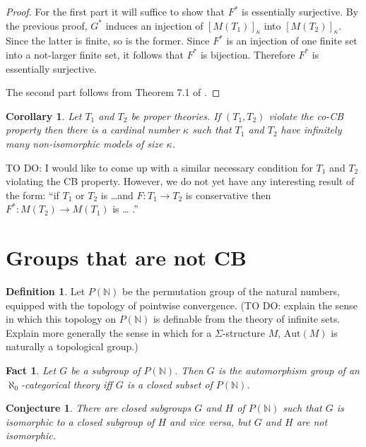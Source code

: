 \documentclass[12pt]{article}
\newtheorem{fact}[prop]{Fact}
\newtheorem{cor}[prop]{Corollary}
\newtheorem{conj}[prop]{Conjecture}
\theoremstyle{definition}
\newtheorem*{defn}{Definition}
\theoremstyle{remark}
\newcommand{\3}{\mathcal}
\begin{document}
\begin{proof} For the first part it will suffice to show that $F^*$ is
  essentially surjective. By the previous proof, $G^*$ induces an
  injection of $[M(T_1)]_\kappa$ into $[M(T_2)]_\kappa$. Since the
  latter is finite, so is the former. Since $F^*$ is an injection of
  one finite set into a not-larger finite set, it follows that $F^*$
  is bijection. Therefore $F^*$ is essentially surjective.

  The second part follows from Theorem 7.1 of
  \citep{summer2020}. \end{proof}

\begin{cor} Let $T_1$ and $T_2$ be proper theories. If $(T_1,T_2)$
  violate the co-CB property then there is a cardinal number $\kappa$
  such that $T_1$ and $T_2$ have infinitely many non-isomorphic models
  of size $\kappa$. \end{cor}

TO DO: I would like to come up with a similar necessary condition for
$T_1$ and $T_2$ violating the CB property. However, we do not yet have
any interesting result of the form: ``if $T_1$ or $T_2$ is \dots and
$F:T_1\to T_2$ is conservative then $F^*:M(T_2)\to M(T_1)$ is \dots
.''



\section{Groups that are not CB}

\begin{defn} Let $P(\mathbb{N})$ be the permutation group of the
  natural numbers, equipped with the topology of pointwise
  convergence. (TO DO: explain the sense in which this topology on
  $P(\mathbb{N})$ is definable from the theory of infinite
  sets. Explain more generally the sense in which for a
  $\Sigma$-structure $M$, $\mathrm{Aut}(M)$ is naturally a topological
  group.) \end{defn}

\begin{fact} Let $G$ be a subgroup of $P(\mathbb{N})$. Then $G$ is the
  automorphism group of an $\aleph _0$-categorical theory iff $G$ is
  a closed subset of $P(\mathbb{N})$. \end{fact}

\begin{conj} There are closed subgroups $G$ and $H$ of
  $P(\mathbb{N})$ such that $G$ is isomorphic to a closed subgroup of
  $H$ and vice versa, but $G$ and $H$ are not
  isomorphic. \end{conj}
\end{document}
